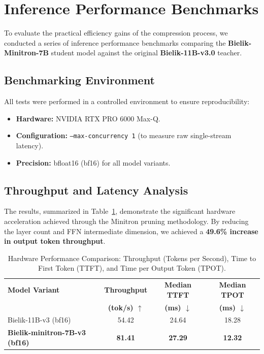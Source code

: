 \documentclass{article}
\begin{document}
\section{Inference Performance Benchmarks}
To evaluate the practical efficiency gains of the compression process, we conducted a series of inference performance benchmarks comparing the \textbf{Bielik-Minitron-7B} student model against the original \textbf{Bielik-11B-v3.0} teacher. 

\subsection{Benchmarking Environment}
All tests were performed in a controlled environment to ensure reproducibility:
\begin{itemize}
    \item \textbf{Hardware:} NVIDIA RTX PRO 6000 Max-Q.
    \item \textbf{Configuration:} \texttt{--max-concurrency 1} (to measure raw single-stream latency).
    \item \textbf{Precision:} bfloat16 (bf16) for all model variants.
\end{itemize}

\subsection{Throughput and Latency Analysis}
The results, summarized in Table~\ref{tab:performance_benchmarks}, demonstrate the significant hardware acceleration achieved through the Minitron pruning methodology. By reducing the layer count and FFN intermediate dimension, we achieved a \textbf{49.6\% increase in output token throughput}.

\begin{table}[h]
    \centering
    \begin{tabular}{lccc}
        \toprule
        \textbf{Model Variant} & \textbf{Throughput} & \textbf{Median TTFT} & \textbf{Median TPOT} \\
        & \textbf{(tok/s) $\uparrow$} & \textbf{(ms) $\downarrow$} & \textbf{(ms) $\downarrow$} \\
        \midrule
        Bielik-11B-v3 (bf16) & 54.42 & 24.64 & 18.28 \\
        \textbf{Bielik-minitron-7B-v3 (bf16)} & \textbf{81.41} & \textbf{27.29} & \textbf{12.32} \\
        \bottomrule
    \end{tabular}
    \caption{Hardware Performance Comparison: Throughput (Tokens per Second), Time to First Token (TTFT), and Time per Output Token (TPOT).}
    \label{tab:performance_benchmarks}
\end{table}
\end{document}
